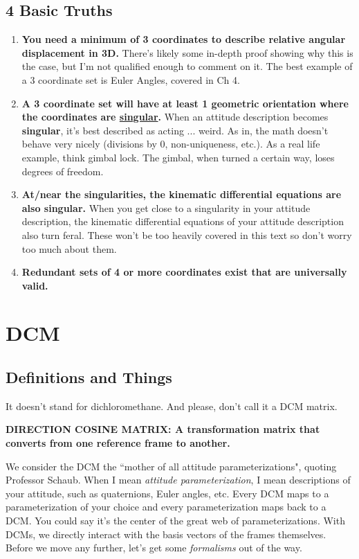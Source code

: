 \documentclass[a4paper,14pt]{extreport}
\begin{document}
\section{4 Basic Truths}
\begin{enumerate}
\item \textbf{You need a minimum of 3 coordinates to describe relative angular displacement in 3D.} There's likely some in-depth proof showing why this is the case, but I'm not qualified enough to comment on it. The best example of a 3 coordinate set is Euler Angles, covered in Ch 4.

\item \textbf{A 3 coordinate set will have at least 1 geometric orientation where the coordinates are \underline{singular}.} When an attitude description becomes \textbf{singular}, it's best described as acting ... weird. As in, the math doesn't behave very nicely (divisions by 0, non-uniqueness, etc.). As a real life example, think gimbal lock. The gimbal, when turned a certain way, loses degrees of freedom.

\item \textbf{At/near the singularities, the kinematic differential equations are also singular.} When you get close to a singularity in your attitude description, the kinematic differential equations of your attitude description also turn feral. These won't be too heavily covered in this text so don't worry too much about them.

\item \textbf{Redundant sets of 4 or more coordinates exist that are universally valid.}

\end{enumerate}
\chapter{DCM}
\section{Definitions and Things}
It doesn't stand for dichloromethane. And please, don't call it a DCM matrix.

\begin{center}
\textbf{DIRECTION COSINE MATRIX: A transformation matrix that converts from one reference frame to another.}
\end{center}

We consider the DCM the ``mother of all attitude parameterizations", quoting Professor Schaub. When I mean \emph{attitude parameterization}, I mean descriptions of your attitude, such as quaternions, Euler angles, etc. Every DCM maps to a parameterization of your choice and every parameterization maps back to a DCM. You could say it's the center of the great web of parameterizations. With DCMs, we directly interact with the basis vectors of the frames themselves. Before we move any further, let's get some \emph{formalisms} out of the way.
\end{document}
